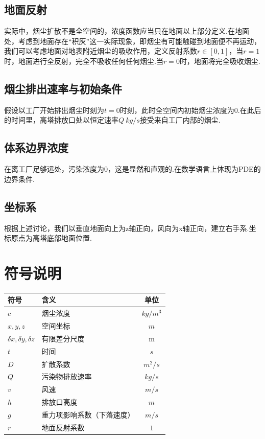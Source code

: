 \documentclass{article}
\begin{document}
	\subsection{地面反射}
	实际中，烟尘扩散不是全空间的，浓度函数应当只在地面以上部分定义.在地面处，考虑到地面存在“积灰”这一实际现象，即烟尘有可能触碰到地面便不再运动，我们可以考虑地面对地表附近烟尘的吸收作用，定义反射系数$r\in[0, 1]$，当$r=1$时，地面进行全反射，完全不吸收任何任何烟尘.当$r=0$时，地面将完全吸收烟尘.
	
	\subsection{烟尘排出速率与初始条件}
	假设以工厂开始排出烟尘时刻为$t=0$时刻，此时全空间内初始烟尘浓度为0.在此后的时间里，高塔排放口处以恒定速率$Q~kg/s$接受来自工厂内部的烟尘.
	
	\subsection{体系边界浓度}
	在离工厂足够远处，污染浓度为0，这是显然和直观的.在数学语言上体现为PDE的边界条件.
	
	\subsection{坐标系}
	根据上述讨论，我们以垂直地面向上为z轴正向，风向为x轴正向，建立右手系.坐标原点为高塔底部地面位置.
	
	\section{符号说明}
	\begin{table}[htbp]
		\centering
		\begin{tabularx}{0.8\textwidth}{XXc}
			\hline
			符号 & 含义 & 单位 \\
			\hline
			$c$ & 烟尘浓度 & $kg/m^3$ \\
			$x, y, z$ & 空间坐标 & $m$ \\
			$\delta x, \delta y, \delta z$ & 有限差分尺度 & m \\
			$t$ & 时间 & $s$ \\
			$D$ & 扩散系数 & $m^2/s$ \\
			$Q$ & 污染物排放速率 & $kg/s$ \\
			$v$ & 风速 & $m/s$ \\
			$h$ & 排放口高度 & $m$ \\
			$g$ & 重力项影响系数（下落速度） & $m/s$ \\
			$r$ & 地面反射系数 & $1$ \\
			\hline
		\end{tabularx}	
	\end{table}
	
\end{document}

